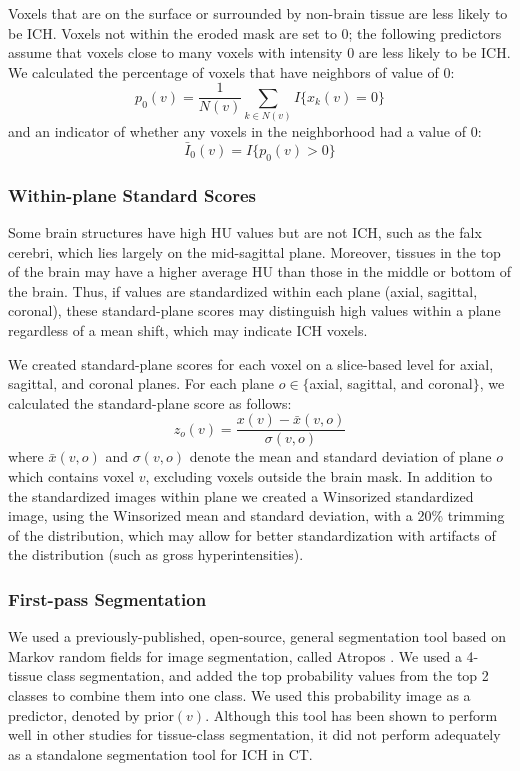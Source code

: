 Voxels that are on the surface or surrounded by non-brain tissue are less likely to be ICH.  Voxels not within the eroded mask are set to $0$; the following predictors assume that voxels close to many voxels with intensity $0$ are less likely to be ICH.    
We calculated the percentage of voxels that have neighbors of value of $0$:
\begin{equation}
p_{0}(v) = \frac{1}{N(v)} \sum_{k \in N(v)} I\{ x_k(v) = 0 \} \label{eq:pct0}
\end{equation}
and an indicator of whether any voxels in the neighborhood had a value of $0$:
\begin{equation}
\bar{I}_{0}(v) = I\{ p_{0}(v) > 0 \} \label{eq:I0}
\end{equation}
 
\subsubsection{Within-plane Standard Scores} Some brain structures have high HU values but are not ICH, such as the falx cerebri, which lies largely on the mid-sagittal plane.  Moreover, tissues in the top of the brain may have a higher average HU than those in the middle or bottom of the brain.  Thus, if values are standardized within each plane (axial, sagittal, coronal), these standard-plane scores may distinguish high values within a plane regardless of a mean shift, which may indicate ICH voxels.

We created standard-plane scores for each voxel on a slice-based level for axial, sagittal, and coronal planes. For each plane $o \in \{$axial, sagittal, and coronal$\}$, we calculated the standard-plane score as follows: 
\begin{equation}
z_{o}(v) = \frac{x(v) - \bar{x}(v, o)}{\sigma(v, o)} \label{eq:z}
\end{equation}
where $\bar{x}(v, o)$ and $\sigma(v, o)$ denote the mean and standard deviation of plane $o$ which contains voxel $v$, excluding voxels outside the brain mask.   In addition to the standardized images within plane we created a Winsorized standardized image, using the Winsorized mean and standard deviation, with a 20\% trimming of the distribution, which may allow for better standardization with artifacts of the distribution (such as gross hyperintensities). 

\subsubsection{First-pass Segmentation} We used a previously-published, open-source, general segmentation tool based on Markov random fields for image segmentation, called Atropos \citep{atropos}.  We used a 4-tissue class segmentation, and added the top probability values from the top 2 classes to combine them into one class.  We used this probability image as a predictor, denoted by $\text{prior}(v)$.  Although this tool has been shown to perform well in other studies for tissue-class segmentation, it did not perform adequately as a standalone segmentation tool for ICH in CT.  

